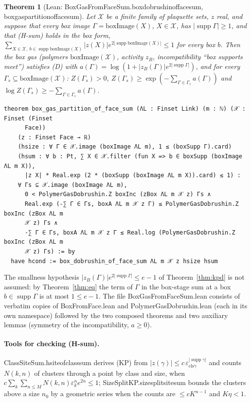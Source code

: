 \documentclass[11pt,a4paper]{article}
\newtheorem{theorem}{Theorem}[section]
\theoremstyle{definition}
\theoremstyle{remark}
\DeclareRobustCommand{\lean}[1]{{\ttfamily\renewcommand{\_}{\textunderscore\allowbreak}#1}}
\newenvironment{leanquote}{\par\smallskip\footnotesize}{\par\smallskip}
\newcommand{\supp}{\operatorname{supp}}
\begin{document}
\begin{theorem}[Lean: \lean{BoxGasFromFaceSum.box\_dobrushin\_of\_face\_sum}, \lean{box\_gas\_partition\_of\_face\_sum}]\label{thm:comp}
Let $\mathcal X$ be a finite family of plaquette sets, $z$ real, and suppose that every box image $\Gamma=\mathrm{boxImage}(X)$, $X\in\mathcal X$, has $|\supp\Gamma|\ge1$, and that (H-sum) holds in the box form, $\sum_{X\in\mathcal X,\ b\in\supp\mathrm{boxImage}(X)}|z(X)|e^{2|\supp\mathrm{boxImage}(X)|}\le1$ for every box $b$. Then the box gas (polymers $\mathrm{boxImage}(\mathcal X)$, activity $z_B$, incompatibility ``box supports meet'') satisfies (D) with $a(\Gamma)=\log(1+|z_B(\Gamma)|e^{2|\supp\Gamma|})$, and for every $\Gamma_s\subseteq\mathrm{boxImage}(\mathcal X)$: $Z(\Gamma_s)>0$, $Z(\Gamma_s)\ge\exp(-\sum_{\Gamma\in\Gamma_s}a(\Gamma))$ and $\log Z(\Gamma_s)\ge-\sum_{\Gamma\in\Gamma_s}a(\Gamma)$.
\end{theorem}
\begin{leanquote}
\begin{verbatim}
theorem box_gas_partition_of_face_sum (ΛL : Finset Link) (m : ℕ) (𝒳 : Finset (Finset
      Face))
    (z : Finset Face → ℝ)
    (hsize : ∀ Γ ∈ 𝒳.image (boxImage ΛL m), 1 ≤ (boxSupp Γ).card)
    (hsum : ∀ b : Pt, ∑ X ∈ 𝒳.filter (fun X => b ∈ boxSupp (boxImage ΛL m X)),
      |z X| * Real.exp (2 * (boxSupp (boxImage ΛL m X)).card) ≤ 1) :
    ∀ Γs ⊆ 𝒳.image (boxImage ΛL m),
      0 < PolymerGasDobrushin.Z boxInc (zBox ΛL m 𝒳 z) Γs ∧
      Real.exp (-∑ Γ ∈ Γs, boxA ΛL m 𝒳 z Γ) ≤ PolymerGasDobrushin.Z boxInc (zBox ΛL m
      𝒳 z) Γs ∧
      -∑ Γ ∈ Γs, boxA ΛL m 𝒳 z Γ ≤ Real.log (PolymerGasDobrushin.Z boxInc (zBox ΛL m
      𝒳 z) Γs) := by
  have hcond := box_dobrushin_of_face_sum ΛL m 𝒳 z hsize hsum
\end{verbatim}
\end{leanquote}
The smallness hypothesis $|z_B(\Gamma)|e^{2|\supp\Gamma|}\le e-1$ of Theorem~\ref{thm:kpd} is not assumed: by Theorem~\ref{thm:eq} the term of $\Gamma$ in the box-stage sum at a box $b\in\supp\Gamma$ is at most $1\le e-1$. The file \lean{BoxGasFromFaceSum.lean} consists of verbatim copies of \lean{BoxFromFace.lean} and \lean{PolymerGasDobrushin.lean} (each in its own namespace) followed by the two composed theorems and two auxiliary lemmas (symmetry of the incompatibility, $a\ge0$).

\paragraph{Tools for checking (H-sum).} \lean{ClassSiteSum.hsite\_of\_class\_sum} derives (KP) from $|z(\gamma)|\le c\,\varepsilon_{\mathrm{cls}\gamma}^{|\supp\gamma|}$ and counts $N(k,n)$ of clusters through a point by class and size, when $c\sum_k\sum_{n\le M}N(k,n)\varepsilon_k^ne^{2n}\le1$; \lean{SizeSplitKP.size\_split\_site\_sum} bounds the clusters above a size $n_0$ by a geometric series when the counts are $\le cK^{n-1}$ and $K\eta<1$.
\end{document}
